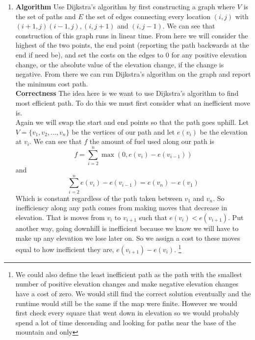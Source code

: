 \documentclass[11pt]{article}
\begin{document}
\begin{enumerate}
\begin{enumerate}
			\end{enumerate}
		\item 
		\textbf{Algorithm}
		Use Dijkstra's algorithm by first constructing a
		graph where $V$ is the set of paths and $E$ the set of edges
			connecting every location $(i,j)$ with $(i+1,j)
		(i-1,j), (i,j+1)$ and $(i,j-1)$. We can see that construction of this
		graph runs in linear time. From here we will consider the
		highest of the two points, the end point (reporting the path
		backwards at the end if need be), and set the
		costs on the edges to $0$ for any positive elevation
		change, or the absolute value of the elevation change,
	if the change is negative. From there we can run Dijkstra's algorithm
		on the graph and report the minimum cost path.\\
		\textbf{Correctness}
		The idea here is we want to use Dijkstra's algorithm to find 
                most efficient path. To do this we must first consider
                what an inefficient move is.\\
		Again we will swap the start and end points so that the path goes
		uphill.
                Let $V = \{v_1,v_2,...,v_n\}$ be the vertices of our path and
                let $e(v_i)$ be the elevation at $v_i$. We can see that $f$ the
                amount of fuel used along our path is
		$$f = \sum_{i=2}^n  \max(0,e(v_{i}) - e(v_{i-1})) $$
                and 
		$$\sum_{i=2}^n  e(v_{i}) - e(v_{i-1}) = e(v_n) - e(v_1) $$
                Which is constant regardless of the path taken between $v_1$ and
                $v_n$.
                So inefficiency along any path comes from making moves that
                decrease in elevation. That is
                moves from $v_i$ to $v_{i+1}$ such that $e(v_i) <
                e(v_{i+1})$. Put another way, going downhill is inefficient
		because we know we will have to make up any elevation we lose
		later on. So we assign a cost to these moves equal to how
		inefficient they are, $e(v_{i+1}) - e(v_{i})$.
                \footnote{We could also define the least inefficient
                path as the path with the smallest number of positive
                elevation changes and make negative elevation changes have a cost of
                zero. We would still find the correct solution eventually and
                the runtime would still be the same if the map
                were finite. However we would first check every square that went
                down in elevation so we would probably spend a lot of time
                descending and
                looking for paths near the base of the mountain and only
}
\end{enumerate}
\end{document}
